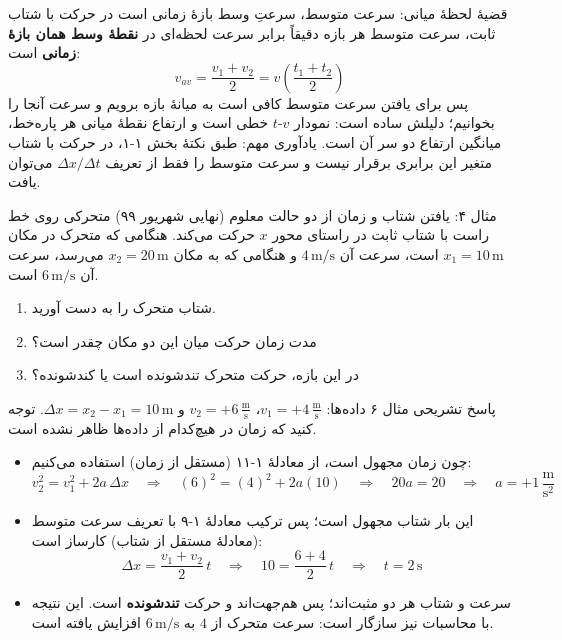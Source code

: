 \documentclass[12pt, a4paper]{article}
\begin{document}
\begin{tipbox}{قضیهٔ لحظهٔ میانی: سرعت متوسط، سرعتِ وسط بازهٔ زمانی است}
در حرکت با شتاب ثابت، سرعت متوسط هر بازه دقیقاً برابر سرعت لحظه‌ای در \textbf{نقطهٔ وسط همان بازهٔ زمانی} است:
\[
v_{av} = \frac{v_1+v_2}{2} = v\left(\frac{t_1+t_2}{2}\right)
\]
پس برای یافتن سرعت متوسط کافی است به میانهٔ بازه برویم و سرعت آنجا را بخوانیم؛ دلیلش ساده است: نمودار $v$-$t$ خطی است و ارتفاع نقطهٔ میانی هر پاره‌خط، میانگین ارتفاع دو سر آن است. یادآوری مهم: طبق نکتهٔ بخش ۱-۱، در حرکت با شتاب متغیر این برابری برقرار نیست و سرعت متوسط را فقط از تعریف $\Delta x/\Delta t$ می‌توان یافت.
\end{tipbox}

\begin{exambox}{مثال ۴: یافتن شتاب و زمان از دو حالت معلوم (نهایی شهریور ۹۹)}
متحرکی روی خط راست با شتاب ثابت در راستای محور $x$ حرکت می‌کند. هنگامی که متحرک در مکان $x_1 = 10\,\text{m}$ است، سرعت آن $4\,\text{m/s}$ و هنگامی که به مکان $x_2 = 20\,\text{m}$ می‌رسد، سرعت آن $6\,\text{m/s}$ است.
\begin{enumerate}
    \item[الف)] شتاب متحرک را به دست آورید.
    \item[ب)] مدت زمان حرکت میان این دو مکان چقدر است؟
    \item[پ)] در این بازه، حرکت متحرک تندشونده است یا کندشونده؟
\end{enumerate}
\end{exambox}

\begin{answerbox}{پاسخ تشریحی مثال ۶}
داده‌ها: $v_1 = +4\,\frac{\text{m}}{\text{s}}$، $v_2 = +6\,\frac{\text{m}}{\text{s}}$ و $\Delta x = x_2 - x_1 = 10\,\text{m}$. توجه کنید که زمان در هیچ‌کدام از داده‌ها ظاهر نشده است.

\begin{itemize}
    \item[الف)] چون زمان مجهول است، از معادلهٔ ۱-۱۱ (مستقل از زمان) استفاده می‌کنیم:
    \[
    v_2^2 = v_1^2 + 2a\,\Delta x \quad \Longrightarrow \quad (6)^2 = (4)^2 + 2a(10) \quad \Longrightarrow \quad 20a = 20 \quad \Longrightarrow \quad a = +1\,\frac{\text{m}}{\text{s}^2}
    \]
    \item[ب)] این بار شتاب مجهول است؛ پس ترکیب معادلهٔ ۱-۹ با تعریف سرعت متوسط (معادلهٔ مستقل از شتاب) کارساز است:
    \[
    \Delta x = \frac{v_1 + v_2}{2}\,t \quad \Longrightarrow \quad 10 = \frac{6+4}{2}\,t \quad \Longrightarrow \quad t = 2\,\text{s}
    \]
    \item[پ)] سرعت و شتاب هر دو مثبت‌اند؛ پس هم‌جهت‌اند و حرکت \textbf{تندشونده} است. این نتیجه با محاسبات نیز سازگار است: سرعت متحرک از $4$ به $6\,\text{m/s}$ افزایش یافته است.
\end{itemize}
\end{answerbox}
\end{document}
